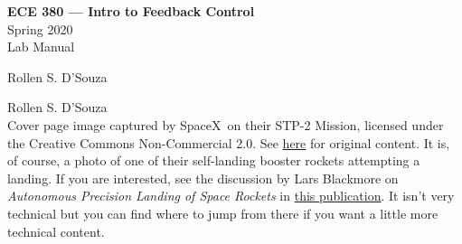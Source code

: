 \documentclass[letterpaper, 12pt, oneside]{memoir}
\begin{document}
\begin{titlingpage}
\vfill
\begin{flushright}
{
  \rmfamily\HUGE\noindent
  \textbf{ECE 380 --- Intro to Feedback Control}\\
  Spring 2020\\
  Lab Manual
}
\end{flushright}
\begin{flushright}
{
  \rmfamily\Large\noindent
  Rollen S. D'Souza
}
\end{flushright}
\vspace{0.25in}
\end{titlingpage}

\restoregeometry

\pagebreak

%
\thispagestyle{empty}
\noindent{} Rollen S. D'Souza\\

\noindent
Cover page image captured by SpaceX\textregistered~on their
STP-2 Mission, licensed under the Creative Commons Non-Commercial 2.0. See
\href{https://www.flickr.com/photos/spacex/48129269942/}{here}
for original content. It is, of course, a photo of one of their self-landing
booster rockets attempting a landing. If you are interested, see the discussion
by Lars Blackmore on \emph{Autonomous Precision Landing of Space Rockets}
in
\href{http://www.larsblackmore.com/nae_bridge_2016.pdf}{this publication}. It
isn't very technical but you can find where to jump from there if you want a
little more technical content.

\pagebreak
\end{document}
